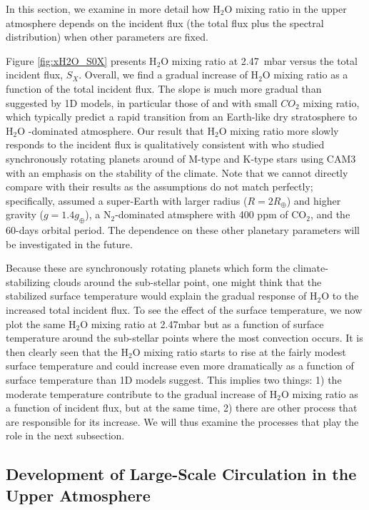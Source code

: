 \documentclass[11pt,numberedappendix,twocolappendix,]{emulateapj}
\def\water{H$_2$O }
\def\preslevel{2.47}
\begin{document}
In this section, we examine in more detail how \water mixing ratio in the upper atmosphere depends on the incident flux (the total flux plus the spectral distribution) when other parameters are fixed. 

Figure \ref{fig:xH2O_S0X} presents \water mixing ratio at \preslevel ~mbar versus the total incident flux, $S_X$. 
Overall, we find a gradual increase of \water mixing ratio as a function of the total incident flux. 
The slope is much more gradual than suggested by 1D models, in particular those  of \citet{Kasting1993} and \citet{Wordsworth2013} with small $CO_2$ mixing ratio, which typically predict a rapid transition from an Earth-like dry stratosphere to  \water-dominated atmosphere. 
Our result that \water mixing ratio more slowly responds to the incident flux is qualitatively consistent with \citet{Yang2013} who studied synchronously rotating planets around of M-type and K-type stars using CAM3 with an emphasis on the stability of the climate. 
Note that we cannot directly compare with their results as the assumptions do not match perfectly; specifically, \cite{Yang2013} assumed a super-Earth with larger radius ($R=2R_{\oplus}$) and higher gravity ($g=1.4g_{\oplus}$), a N$_2$-dominated atmsphere with 400 ppm of CO$_2$, and the 60-days orbital period. 
The dependence on these other planetary parameters will be investigated in the future. 

Because these are synchronously rotating planets which form the climate-stabilizing clouds around the sub-stellar point, one might think that the stabilized surface temperature would explain the gradual response of \water to the increased total incident flux. 
To see the effect of the surface temperature, we now plot the same \water mixing ratio at \preslevel mbar but as a function of surface temperature around the sub-stellar points where the most convection occurs. 
It is then clearly seen that the \water mixing ratio starts to rise at the fairly modest surface temperature and could increase even more dramatically as a function of surface temperature than 1D models suggest. 
This implies two things: 1) the moderate temperature contribute to the gradual increase of \water mixing ratio as a function of incident flux, but at the same time, 2) there are other process that are responsible for its increase. 
We will thus examine the processes that play the role in the next subsection. 

\subsection{Development of Large-Scale Circulation in the Upper Atmosphere}
\label{ss:result_omega}
\end{document}
